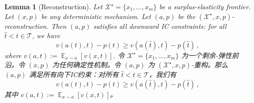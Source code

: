 \documentclass[12pt,letterpaper]{article}
\newenvironment{original}{\color{black}\noindent}{}
\newenvironment{translation}{\color{blue}\noindent}{}
\theoremstyle{plain}
\newtheorem{lemma}{Lemma}
\theoremstyle{definition}
\theoremstyle{remark}
\DeclareMathOperator{\E}{\mathds{E}}
\renewcommand{\1}{\mathds{1}}
\newcommand{\X}{\mathcal{X}}
\theoremstyle{definition}
\begin{document}
\begin{lemma}[Reconstruction]\label{lem:reconstruct}
\begin{original}
Let $\X^\star=\{x_1, \dots, x_m\}$ be a surplus-elasticity frontier. Let $(x, p)$ be any deterministic mechanism. Let $(a, p)$ be the $(\X^\star, x, p)$-reconstruction. Then $(a, p)$ satisfies all downward IC constraints: for all $\hat{t} < t \in \mathcal{T}$, we have
\[v(a(t), t) - p(t) \geq v(a(\hat{t}), t) - p(\hat{t})\,,\]
where $v(a, t):= \E_{x\sim a}[v(x, t)]$.
\end{original}
\begin{translation}
令 $\X^\star=\{x_1, \dots, x_m\}$ 为一个剩余-弹性前沿。令 $(x, p)$ 为任何确定性机制。令 $(a, p)$ 为 $(\X^\star, x, p)$-重构。那么 $(a, p)$ 满足所有向下IC约束：对所有 $\hat{t} < t \in \mathcal{T}$，我们有
\[v(a(t), t) - p(t) \geq v(a(\hat{t}), t) - p(\hat{t})\,,\]
其中 $v(a, t):= \E_{x\sim a}[v(x, t)]$。
\end{translation}
\end{lemma}
\end{document}
